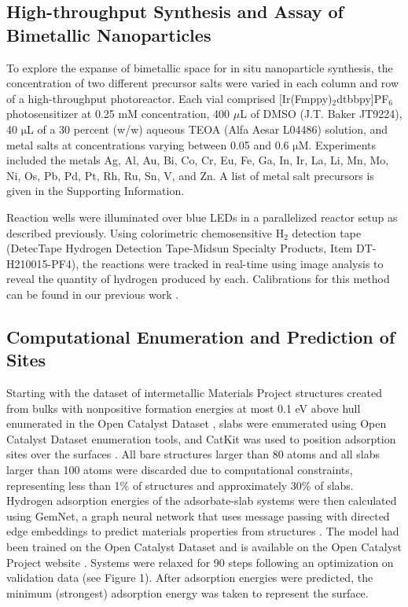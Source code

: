\documentclass[preprint,12pt]{elsarticle}
\begin{document}
\subsection{High-throughput Synthesis and Assay of Bimetallic Nanoparticles}
To explore the expanse of bimetallic space for in situ nanoparticle synthesis, the concentration of two different precursor salts were varied in each column and row of a high-throughput photoreactor. Each vial comprised [Ir(Fmppy)$_2$dtbbpy]PF$_6$ photosensitizer at 0.25 mM concentration, 400 $\mu$L of DMSO (J.T. Baker JT9224), 40 $\mathrm{\mu}$L of a 30 percent (w/w) aqueous TEOA (Alfa Aesar L04486) solution, and metal salts at concentrations varying between 0.05 and 0.6 $\mathrm{\mu}$M. Experiments included the metals Ag, Al, Au, Bi, Co, Cr, Eu, Fe, Ga, In, Ir, La, Li, Mn, Mo, Ni, Os, Pb, Pd, Pt, Rh, Ru, Sn, V, and Zn. A list of metal salt precursors is given in the Supporting Information.

Reaction wells were illuminated over blue LEDs in a parallelized reactor setup as described previously. Using colorimetric chemosensitive H$_2$ detection tape (DetecTape Hydrogen Detection Tape-Midsun Specialty Products, Item DT-H210015-PF4), the reactions were tracked in real-time using image analysis to reveal the quantity of hydrogen produced by each. Calibrations for this method can be found in our previous work \cite{lopato2020parallelized}.


\subsection{Computational Enumeration and Prediction of Sites}\label{Section:Experimental/Enumeration}
Starting with the dataset of intermetallic Materials Project structures created from bulks with nonpositive formation energies at most 0.1 eV above hull enumerated in the Open Catalyst Dataset \cite{chanussot2021open,ong2013python}, slabs were enumerated using Open Catalyst Dataset enumeration tools, and CatKit was used to position adsorption sites over the surfaces \cite{boes2019graph}. All bare structures larger than 80 atoms and all slabs larger than 100 atoms were discarded due to computational constraints, representing less than 1\% of structures and approximately 30\% of slabs. Hydrogen adsorption energies of the adsorbate-slab systems were then calculated using GemNet, a graph neural network that uses message passing with directed edge embeddings to predict materials properties from structures \cite{klicpera2021gemnet}. The model had been trained on the Open Catalyst Dataset and is available on the Open Catalyst Project website \cite{chanussot2021open}. Systems were relaxed for 90 steps following an optimization on validation data (see Figure 1). After adsorption energies were predicted, the minimum (strongest) adsorption energy was taken to represent the surface. 
\end{document}
